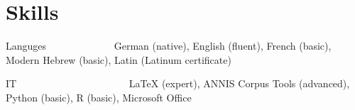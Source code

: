 \documentclass[11pt]{article}
\begin{document}
\section*{Skills}

\begin{list}{}{
		\setlength{\leftmargin}{3.5cm}
		\setlength{\itemindent}{-2.5cm}
	}
	
	\item[Languges~~~~~~~~~~~~~] German (native), English (fluent), French (basic), Modern Hebrew (basic), Latin (Latinum certificate)
	\item[IT~~~~~~~~~~~~~~~~~~~~~~] LaTeX (expert), ANNIS Corpus Tools (advanced), Python (basic), R (basic), Microsoft Office
	
\end{list}

\vspace{2\baselineskip}
\end{document}
